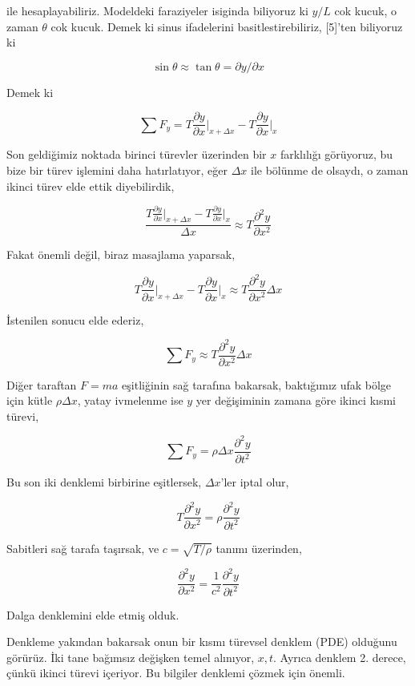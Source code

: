 \documentclass[12pt,fleqn]{article}\usepackage{../../common}
\begin{document}
ile hesaplayabiliriz. Modeldeki faraziyeler isiginda biliyoruz ki $y/L$ cok
kucuk, o zaman $\theta$ cok kucuk. Demek ki sinus ifadelerini
basitlestirebiliriz, [5]'ten biliyoruz ki

$$
\sin\theta \approx \tan\theta = \partial y / \partial x
$$

Demek ki

$$
\sum F_y =
T \frac{\partial y}{\partial x} \bigg\vert_{x+\Delta x} -
T \frac{\partial y}{\partial x} \bigg\vert_{x}
$$

Son geldiğimiz noktada birinci türevler üzerinden bir $x$ farklılığı görüyoruz,
bu bize bir türev işlemini daha hatırlatıyor, eğer $\Delta x$ ile bölünme de
olsaydı, o zaman ikinci türev elde ettik diyebilirdik,

$$
\frac{
T \frac{\partial y}{\partial x} \bigg\vert_{x+\Delta x} -
T \frac{\partial y}{\partial x} \bigg\vert_{x}
}{\Delta x} \approx T \frac{\partial^2 y}{\partial x^2}
$$

Fakat önemli değil, biraz masajlama yaparsak, 

$$
T \frac{\partial y}{\partial x} \bigg\vert_{x+\Delta x} -
T \frac{\partial y}{\partial x} \bigg\vert_{x} \approx
T \frac{\partial^2 y}{\partial x^2} \Delta x 
$$

İstenilen sonucu elde ederiz, 

$$
\sum F_y \approx T \frac{\partial^2 y}{\partial x^2} \Delta x
$$

Diğer taraftan $F=ma$ eşitliğinin sağ tarafına bakarsak, baktığımız ufak bölge
için kütle $\rho\Delta x$, yatay ivmelenme ise $y$ yer değişiminin zamana göre
ikinci kısmi türevi,

$$
\sum F_y = \rho \Delta x \frac{\partial^2 y}{\partial t^2}
$$

Bu son iki denklemi birbirine eşitlersek, $\Delta x$'ler iptal olur, 

$$
T \frac{\partial^2 y}{\partial x^2}  =
\rho \frac{\partial^2 y}{\partial t^2}
$$

Sabitleri sağ tarafa taşırsak, ve $c = \sqrt{T / \rho}$ tanımı üzerinden,

$$
\frac{\partial^2 y}{\partial x^2}  =
\frac{1}{c^2}\frac{\partial^2 y}{\partial t^2}
$$

Dalga denklemini elde etmiş olduk.

Denkleme yakından bakarsak onun bir kısmı türevsel denklem (PDE) olduğunu
görürüz. İki tane bağımsız değişken temel alınıyor, $x,t$. Ayrıca denklem
2. derece, çünkü ikinci türevi içeriyor. Bu bilgiler denklemi çözmek için
önemli.
\end{document}
